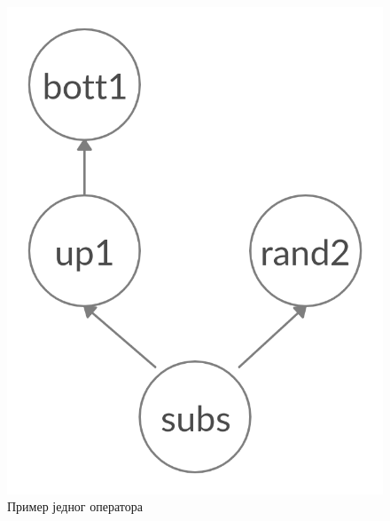 \documentclass[a4paper]{article}
\begin{document}
\begin{figure}[h!]
    \begin{center}
    \includegraphics[scale=0.12]{mgp_primer.png}
    \end{center}
    \caption{Пример једног оператора}
    \label{fig:mgp_primer}
\end{figure}

\end{document}
